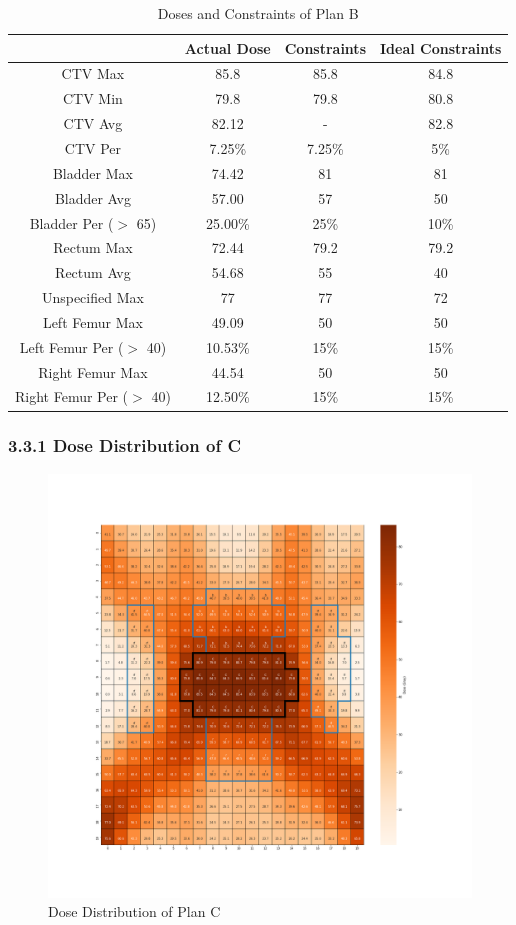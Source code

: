 \documentclass{report}
\begin{document}
\begin{table}[H]
\centering
\begin{tabular}{||c|c c c||} 
 \hline
  & Actual Dose & Constraints & Ideal Constraints \\ [0.5ex] 
 \hline
 CTV Max & 85.8 & 85.8 & 84.8 \\ 
 CTV Min & 79.8 & 79.8 & 80.8 \\
 CTV Avg & 82.12 & - & 82.8 \\
 CTV Per & 7.25\% & 7.25\% & 5\% \\
 \hline
 Bladder Max & 74.42 & 81 & 81 \\
 Bladder Avg & 57.00 & 57 & 50 \\
 Bladder Per ($>$ 65) & 25.00\% & 25\% & 10\% \\ 
 \hline
 Rectum Max & 72.44 & 79.2 & 79.2 \\ 
 Rectum Avg & 54.68 & 55 & 40 \\ 
 \hline
 Unspecified Max & 77 & 77 & 72 \\ 
 \hline
 Left Femur Max& 49.09 & 50 & 50 \\ 
 Left Femur Per ($>$ 40)& 10.53\% & 15\% & 15\% \\ 
 \hline
 Right Femur Max& 44.54 & 50 & 50 \\ 
 Right Femur Per ($>$ 40)& 12.50\% & 15\% & 15\% \\ 
 \hline
\end{tabular}
\caption{Doses and Constraints of Plan B}
\label{table:3}
\end{table}

\subsubsection{3.3.1 Dose Distribution of C}

\begin{figure}[H]
    \centering
    \includegraphics[width=0.95\columnwidth]{c-dose.png}
    \caption{Dose Distribution of Plan C}
    
\end{figure}
\end{document}

